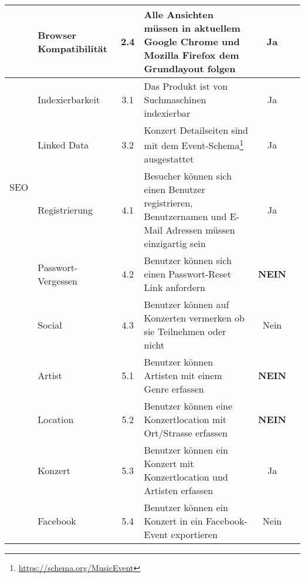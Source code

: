 \begin{longtable}[]{@{}p{1.9cm}p{2.5cm}cp{5.5cm}cc@{}}
                             & Browser Kompatibilität     & 2.4          & Alle Ansichten müssen in aktuellem Google Chrome und Mozilla Firefox dem Grundlayout folgen                 & Ja                              \\
  \midrule
  \multirow{4}{*}{SEO}       & Indexierbarkeit            & 3.1          & Das Produkt ist von Suchmaschinen indexierbar                                                               & Ja                              \\ \cline{2-6}
                             & Linked Data                & 3.2          & Konzert Detailseiten sind mit dem Event-Schema\footnote{\url{https://schema.org/MusicEvent}} ausgestattet   & Ja                              \\
  \midrule
  \multirow{8}{*}{Benutzer}  & Registrierung              & 4.1          & Besucher können sich einen Benutzer registrieren, Benutzernamen und E-Mail Adressen müssen einzigartig sein & Ja                              \\ \cline{2-6}
                             & Passwort-Vergessen         & 4.2          & Benutzer können sich einen Passwort-Reset Link anfordern                                                    & \textbf{NEIN}                   \\ \cline{2-6}
                             & Social                     & 4.3          & Benutzer können auf Konzerten vermerken ob sie Teilnehmen oder nicht                                        & Nein                            \\
  \midrule
  \clearpage
  \multirow{6}{*}{Erfassung} & Artist                     & 5.1          & Benutzer können Artisten mit einem Genre erfassen                                                           & \textbf{NEIN}                   \\ \cline{2-6}
                             & Location                   & 5.2          & Benutzer können eine Konzertlocation mit Ort/Strasse erfassen                                               & \textbf{NEIN}                   \\ \cline{2-6}
                             & Konzert                    & 5.3          & Benutzer können ein Konzert mit Konzertlocation und Artisten erfassen                                       & Ja                              \\ \cline{2-6}
                             & Facebook                   & 5.4          & Benutzer können ein Konzert in ein Facebook-Event exportieren                                               & Nein                            \\

\end{longtable}
